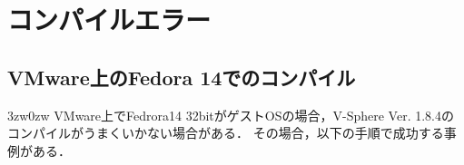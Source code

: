 
\section{コンパイルエラー}
\label{sec:compile_error}

%
\subsection{VMware上のFedora 14でのコンパイル}
\label{VMware}

\begin{indentation}{3zw}{0zw}
VMware上でFedrora14 32bitがゲストOSの場合，V-Sphere Ver. 1.8.4のコンパイルがうまくいかない場合がある．
その場合，以下の手順で成功する事例がある．

\end{indentation}

